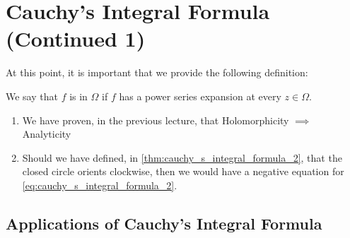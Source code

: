 \documentclass[11pt, oneside]{book}
\begin{document}
\section{Cauchy's Integral Formula (Continued 1)} %
\label{sec:cauchy_s_integral_formula_continued_1}

At this point, it is important that we provide the following definition:

\begin{defn}\label{defn:analytic_functions}
  We say that $f$ is  in $\Omega$ if $f$ has a power series expansion at every $z \in \Omega$.
\end{defn}

\begin{remark}
	\begin{enumerate}
		\item We have proven, in the previous lecture, that Holomorphicity $\implies$ Analyticity
		\item Should we have defined, in \cref{thm:cauchy_s_integral_formula_2}, that the closed circle orients clockwise, then we would have a negative equation for \cref{eq:cauchy_s_integral_formula_2}.
	\end{enumerate}
\end{remark}

\subsection{Applications of Cauchy's Integral Formula} %
\label{sub:applications_of_cauchy_s_integral_formula}
\end{document}
